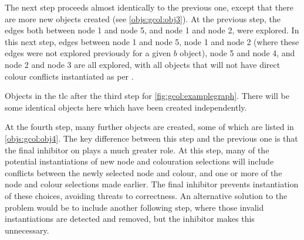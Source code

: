 The next step proceeds almost identically to the previous one, except that there are more new objects created (see \cref{objs:gcol:obj3}).  At the previous step, the edges both between node 1 and node 5, and node 1 and node 2, were explored.  In this next step, edges between node 1 and node 5, node 1 and node 2 (where these edges were not explored previously for a given \(b\) object), node 5 and node 4, and node 2 and node 3 are all explored, with all objects that will not have direct colour conflicts instantiated as per .

\begin{cpobjectsfloat}
\begin{cpobjects}
%    
    \cpobjectsline{
        \vdots
    }
\end{cpobjects}
\caption[Objects in the \gls{tlc} after the third step, for \cref{fig:gcol:examplegraph}]{\label{objs:gcol:obj3}Objects in the \gls{tlc} after the third step for \cref{fig:gcol:examplegraph}.  There will be some identical objects here which have been created independently.}
\end{cpobjectsfloat}

At the fourth step, many further objects are created, some of which are listed in \cref{objs:gcol:obj4}.  The key difference between this step and the previous one is that the final \gls{inhibitor} on  plays a much greater role.  At this step, many of the potential instantiations of new node and colouration selections will include conflicts between the newly selected node and colour, and one or more of the node and colour selections made earlier.  The final \gls{inhibitor} prevents instantiation of these choices, avoiding threats to correctness.  An alternative solution to the problem would be to include another following step, where those invalid instantiations are detected and removed, but the \gls{inhibitor} makes this unnecessary.  

